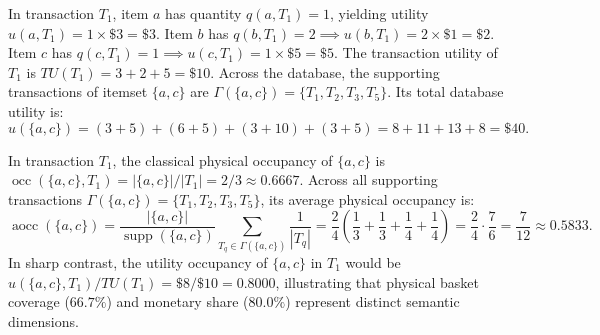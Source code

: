 \documentclass[runningheads]{llncs}
\newcommand{\supp}{\operatorname{supp}}
\newcommand{\aocc}{\operatorname{aocc}}
\begin{document}
\begin{example}
In transaction $T_1$, item $a$ has quantity $q(a, T_1) = 1$, yielding utility $u(a, T_1) = 1 \times \$3 = \$3$. Item $b$ has $q(b, T_1) = 2 \implies u(b, T_1) = 2 \times \$1 = \$2$. Item $c$ has $q(c, T_1) = 1 \implies u(c, T_1) = 1 \times \$5 = \$5$.
The transaction utility of $T_1$ is $TU(T_1) = 3 + 2 + 5 = \$10$.
Across the database, the supporting transactions of itemset $\{a, c\}$ are $\Gamma(\{a, c\}) = \{T_1, T_2, T_3, T_5\}$. Its total database utility is:
\begin{equation*}
u(\{a, c\}) = (3+5) + (6+5) + (3+10) + (3+5) = 8 + 11 + 13 + 8 = \$40.
\end{equation*}
\end{example}

\begin{example}
In transaction $T_1$, the classical physical occupancy of $\{a, c\}$ is $\operatorname{occ}(\{a, c\}, T_1) = |\{a, c\}| / |T_1| = 2/3 \approx 0.6667$.
Across all supporting transactions $\Gamma(\{a, c\}) = \{T_1, T_2, T_3, T_5\}$, its average physical occupancy is:
\begin{equation*}
\aocc(\{a, c\}) = \frac{|\{a, c\}|}{\supp(\{a, c\})} \sum_{T_q \in \Gamma(\{a, c\})} \frac{1}{|T_q|} = \frac{2}{4} \left(\frac{1}{3} + \frac{1}{3} + \frac{1}{4} + \frac{1}{4}\right) = \frac{2}{4} \cdot \frac{7}{6} = \frac{7}{12} \approx 0.5833.
\end{equation*}
In sharp contrast, the utility occupancy of $\{a, c\}$ in $T_1$ would be $u(\{a, c\}, T_1)/TU(T_1) = \$8/\$10 = 0.8000$, illustrating that physical basket coverage ($66.7\%$) and monetary share ($80.0\%$) represent distinct semantic dimensions.
\end{example}
\end{document}
